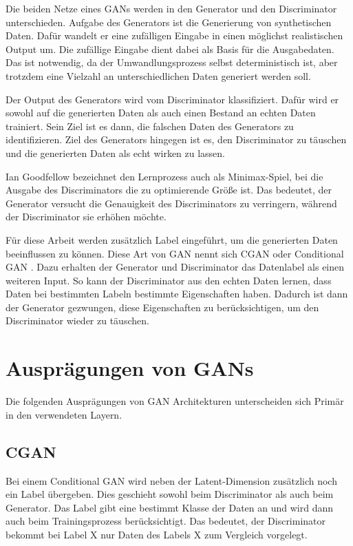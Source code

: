 Die beiden Netze eines GANs werden in den Generator und den Discriminator unterschieden.
Aufgabe des Generators ist die Generierung von synthetischen Daten.
Dafür wandelt er eine zufälligen Eingabe in einen möglichst realistischen Output um.
Die zufällige Eingabe dient dabei als Basis für die Ausgabedaten.
Das ist notwendig, da der Umwandlungsprozess selbst deterministisch ist, aber trotzdem eine Vielzahl an unterschiedlichen Daten generiert werden soll.
\newline

Der Output des Generators wird vom Discriminator klassifiziert.
Dafür wird er sowohl auf die generierten Daten als auch einen Bestand an echten Daten trainiert.
Sein Ziel ist es dann, die falschen Daten des Generators zu identifizieren.
Ziel des Generators hingegen ist es, den Discriminator zu täuschen und die generierten Daten als echt wirken zu lassen.
\newline

Ian Goodfellow bezeichnet den Lernprozess auch als Minimax-Spiel, bei die Ausgabe des Discriminators die zu optimierende Größe ist.
Das bedeutet, der Generator versucht die Genauigkeit des Discriminators zu verringern, während der Discriminator sie erhöhen möchte. \cite{gan-minimax} 
\newline


Für diese Arbeit werden zusätzlich Label eingeführt, um die generierten Daten beeinflussen zu können. 
Diese Art von GAN nennt sich CGAN oder Conditional GAN \cite{gan-conditional}.
Dazu erhalten der Generator und Discriminator das Datenlabel als einen weiteren Input.
So kann der Discriminator aus den echten Daten lernen, dass Daten bei bestimmten Labeln bestimmte Eigenschaften haben.
Dadurch ist dann der Generator gezwungen, diese Eigenschaften zu berücksichtigen, um den Discriminator wieder zu täuschen.

\section{Ausprägungen von GANs}
Die folgenden Ausprägungen von GAN Architekturen unterscheiden sich Primär in den verwendeten Layern.

\subsection{CGAN}
Bei einem Conditional GAN \cite{mirza2014conditional} wird neben der Latent-Dimension zusätzlich noch ein Label übergeben.
Dies geschieht sowohl beim Discriminator als auch beim Generator.
Das Label gibt eine bestimmt Klasse der Daten an und wird dann auch beim Trainingsprozess berücksichtigt.
Das bedeutet, der Discriminator bekommt bei Label X nur Daten des Labels X zum Vergleich vorgelegt.
\newline

